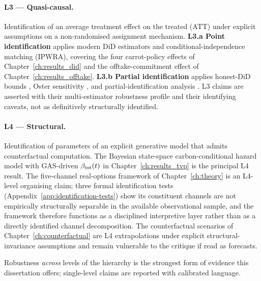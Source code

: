 \paragraph{L3 --- Quasi-causal.} Identification of an average treatment effect on the treated (ATT) under explicit assumptions on a non-randomised assignment mechanism. \textbf{L3.a Point identification} applies modern DiD estimators \cite{sun2021estimating, borusyak2024revisiting, callaway2021difference} and conditional-independence matching (IPWRA), covering the four carrot-policy effects of Chapter~\ref{ch:results_did} and the offtake-commitment effect of Chapter~\ref{ch:results_offtake}. \textbf{L3.b Partial identification} applies honest-DiD bounds \cite{rambachan2023more}, Oster sensitivity \cite{oster2019unobservable}, and partial-identification analysis \cite{manski2003partial}. L3 claims are asserted with their multi-estimator robustness profile and their identifying caveats, not as definitively structurally identified.

\paragraph{L4 --- Structural.} Identification of parameters of an explicit generative model that admits counterfactual computation. The Bayesian state-space carbon-conditional hazard model with GAS-driven $\beta_{\mathrm{int}}(t)$ in Chapter~\ref{ch:results_tvp} is the principal L4 result. The five-channel real-options framework of Chapter~\ref{ch:theory} is an L4-level organising claim; three formal identification tests (Appendix~\ref{app:identification-tests}) show its constituent channels are not empirically structurally separable in the available observational sample, and the framework therefore functions as a disciplined interpretive layer rather than as a directly identified channel decomposition. The counterfactual scenarios of Chapter~\ref{ch:counterfactual} are L4 extrapolations under explicit structural-invariance assumptions and remain vulnerable to the \cite{lucas1976econometric} critique if read as forecasts.

Robustness \emph{across} levels of the hierarchy is the strongest form of evidence this dissertation offers; single-level claims are reported with calibrated language.

